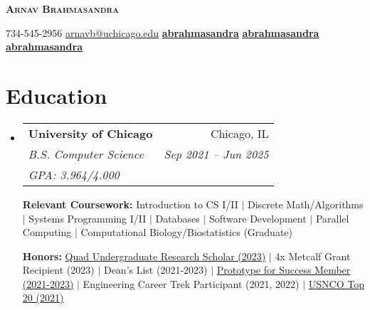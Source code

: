 \documentclass[letterpaper,11pt]{article}
\makeatletter
\newcommand{\phonesymbol}{\faPhone}
\newcommand{\homepagesymbol}{\faChain}
\newcommand{\linkedinsymbol}{\faLinkedin}
\newcommand{\githubsymbol}{\faGithub}
\newcommand{\mailsymbol}{\faEnvelope}
\newcommand{\printinfo}[2]{\mbox{{#1}\hspace{0.5em}#2\hspace{0.5em}}}
\newcommand{\mailaddress}[1]{\printinfo{\mailsymbol}{#1}}
\newcommand{\phone}[1]{\printinfo{\phonesymbol}{#1}}
\newcommand{\homepage}[1]{\printinfo{\homepagesymbol}{#1}}
\newcommand{\linkedin}[1]{\printinfo{\linkedinsymbol}{#1}}
\newcommand{\github}[1]{\printinfo{\githubsymbol}{#1}}
\newcommand{\courseItem}[1]{
    {\small #1 \vspace{-2pt}}
}
\newcommand{\honorsItem}[1]{
    {\small #1 \vspace{-2pt}}
}
\newcommand{\resumeEduSubheading}[5]{
  \vspace{-2pt}\item
    \begin{tabular*}{0.97\textwidth}[t]{l@{\extracolsep{\fill}}r}
      \textbf{#1} & #2 \\
      \textit{\small#3} & \textit{\small #4} \\
      \textit{\small#5}
    \end{tabular*}\vspace{-7pt}
}
\newcommand{\resumeSubHeadingListStart}{\begin{itemize}[leftmargin=0.15in, label={}]}
\newcommand{\resumeSubHeadingListEnd}{\end{itemize}}
\makeatother
\begin{document}

\begin{center}
    \textbf{\Huge \scshape Arnav Brahmasandra} \\ \vspace{1pt}
    
    \phone{734-545-2956} 
    \mailaddress{\href{mailto:arnavb@uchicago.edu}{arnavb@uchicago.edu}}
    \linkedin{\href{https://www.linkedin.com/in/abrahmasandra/}{\textbf{abrahmasandra}}}
    \github{\href{https://github.com/abrahmasandra}{\textbf{abrahmasandra}}}
    \homepage{\href{https://abrahmasandra.github.io/}{\textbf{abrahmasandra}}}
\end{center}


\section{Education}
  \resumeSubHeadingListStart
    \resumeEduSubheading
      {University of Chicago}{Chicago, IL}
      {B.S. Computer Science}{Sep 2021 -- Jun 2025}{GPA: 3.964/4.000} \newline

    \textbf{Relevant Coursework:} \courseItem{Introduction to CS I/II $|$ Discrete Math/Algorithms $|$ Systems Programming I/II $|$ Databases $|$ Software Development $|$ Parallel Computing $|$ Computational Biology/Biostatistics (Graduate)}
    
    \textbf{Honors:} \honorsItem{\href{https://ugradresearchsymposium.omeka.net/items/show/120}{Quad Undergraduate Research Scholar (2023)} $|$ 4x Metcalf Grant Recipient (2023) $|$ Dean's List (2021-2023) $|$ \href{https://careeradvancement.uchicago.edu/careers-in/engineering/prototype-for-success/class-of-2025}{Prototype for Success Member (2021-2023)} $|$ Engineering Career Trek Participant (2021, 2022) $|$  \href{https://www.acs.org/content/acs/en/pressroom/newsreleases/2021/may/2021-chemistry-olympiad-virtual-study-camp-students-named.html}{USNCO Top 20 (2021)}}
  \resumeSubHeadingListEnd
\end{document}
